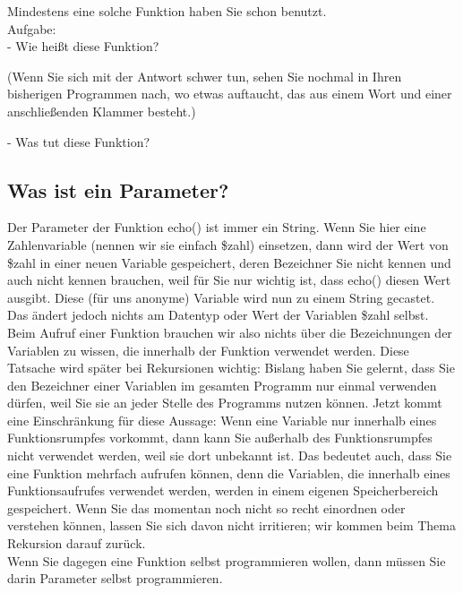 Mindestens eine solche Funktion haben Sie schon benutzt.\\

Aufgabe:\\

-	Wie heißt diese Funktion?

(Wenn Sie sich mit der Antwort schwer tun, sehen Sie nochmal in Ihren bisherigen Programmen nach, wo etwas auftaucht, das aus einem Wort und einer anschließenden Klammer besteht.)

-	Was tut diese Funktion?

\subsection{Was ist ein Parameter?}

Der Parameter der Funktion echo() ist immer ein String. Wenn Sie hier eine Zahlenvariable (nennen wir sie einfach \$zahl) einsetzen, dann wird der Wert von \$zahl in einer neuen Variable gespeichert, deren Bezeichner Sie nicht kennen und auch nicht kennen brauchen, weil für Sie nur wichtig ist, dass echo() diesen Wert ausgibt. Diese (für uns anonyme) Variable wird nun zu einem String gecastet. Das ändert jedoch nichts am Datentyp oder Wert der Variablen \$zahl selbst.\\

Beim Aufruf einer Funktion brauchen wir also nichts über die Bezeichnungen der Variablen zu wissen, die innerhalb der Funktion verwendet werden. Diese Tatsache wird später bei Rekursionen wichtig: Bislang haben Sie gelernt, dass Sie den Bezeichner einer Variablen im gesamten Programm nur einmal verwenden dürfen, weil Sie sie an jeder Stelle des Programms nutzen können. Jetzt kommt eine Einschränkung für diese Aussage: Wenn eine Variable nur innerhalb eines Funktionsrumpfes vorkommt, dann kann Sie außerhalb des Funktionsrumpfes nicht verwendet werden, weil sie dort unbekannt ist. Das bedeutet auch, dass Sie eine Funktion mehrfach aufrufen können, denn die Variablen, die innerhalb eines Funktionsaufrufes verwendet werden, werden in einem eigenen Speicherbereich gespeichert. Wenn Sie das momentan noch nicht so recht einordnen oder verstehen können, lassen Sie sich davon nicht irritieren; wir kommen beim Thema Rekursion darauf zurück.\\

Wenn Sie dagegen eine Funktion selbst programmieren wollen, dann müssen Sie darin Parameter selbst programmieren.\\


